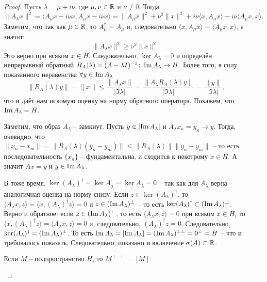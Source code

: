 \begin{proof}
    Пусть $\lambda = \mu + i \nu$, где $\mu, \nu \in \mathbb{R}$ и $\nu \neq 0$.
    Тогда
    \[
        \|A_\lambda x\|^2 =  \langle A_\mu x - i\nu x, A_\mu x - i \nu x \rangle = \|A_\mu x\|^2 + \nu^2 \|x\|^2 + i \nu \langle x, A_\mu x \rangle - i \nu \langle A_\mu x, x \rangle.
    \]
    Заметим, что так как $\mu \in \mathbb{R}$, то $A_\mu^\dagger = A_\mu$ и, следовательно $\langle x, A_\mu x \rangle = \langle A_\mu x, x \rangle$, а значит:
    \[
        \|A_\lambda x\|^2 \geq \nu^2 \|x\|^2.
    \]
    Это верно при всяком $x \in H$. Следовательно, $\ker A_\lambda = 0$ и определён непрерывный обратный $R_A(\lambda) = (A - \lambda I)^{-1}\colon \operatorname{Im} A_\lambda \to H$.
    Более того, в силу показанного неравенства $\forall y \in \operatorname{Im} A_\lambda$
    \[
        \|R_A(\lambda)y\| = \|x\| \leq \frac{\|A_\lambda x\|}{|\Im \lambda|} = \frac{\|A_\lambda R_A(\lambda)y\|}{|\Im \lambda|} = \frac{\|y\|}{|\Im \lambda|},
    \]
    что и даёт нам искомую оценку на норму обратного оператора. Покажем, что $\operatorname{Im} A_\lambda = H$.
    
    Заметим, что образ $A_\lambda$ -- замкнут.
    Пусть $y \in [\operatorname{Im} A_\lambda]$ и $A_\lambda x_n = y_n \rightarrow y$.
    Тогда, очевидно, что $\|x_n - x_m\| = \|R_A(\lambda)(y_n - y_m)\| \leq \|R_A(\lambda)\|\|y_n - y_m\|$ -- то есть последовательность $\{x_n\}$ -- фундаментальна, и сходится к некотрому $x \in H$.
    А значит $Ax = y$ и $y \in \operatorname{Im} A_\lambda$.

    В тоже время, $\ker (A_\lambda)^\dagger = \ker A^\dagger_{\overline{\lambda}} = \ker A_{\overline{\lambda}} = 0$ -- так как для $A_{\overline{\lambda}}$ верна аналогичная оценка на норму снизу.
    Если $z \in \ker (A_\lambda)^\dagger$, то $\langle A_\lambda x, z \rangle  = \langle x, (A_\lambda)^\dagger z \rangle = 0$ и $z \in (\operatorname{Im} A_\lambda)^\perp $ -- то есть $\ker (A_\lambda)^\dagger \subset (\operatorname{Im} A_\lambda)^\perp$.
    Верно и обратное: если $z \in (\operatorname{Im} A_\lambda)^\perp$, то есть $\langle A_\lambda x, z \rangle = 0$ при всяком $x \in H$, то $\langle x, (A_\lambda)^\dagger z \rangle = \langle A_\lambda x, z \rangle = 0$ и, следовательно, $(A_\lambda)^\dagger z = 0$.
    Следовательно, $\ker (A_\lambda)^\dagger = (\operatorname{Im} A_\lambda)^\perp$.
    То есть $\operatorname{Im} A_\lambda = [\operatorname{Im} A_\lambda] = (\operatorname{Im} A_\lambda)^{\perp \perp} = 0^\perp = H$ -- что и требовалось показать.
    Следовательно, показано и включение $\sigma(A) \subset \mathbb{R}$.

    \begin{note}
        Если $M$ -- подпространство $H$, то $M^{\perp \perp} = [M]$.


\end{note}
\end{proof}
